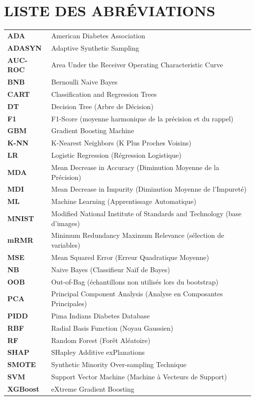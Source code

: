 \chapter*{LISTE DES ABRÉVIATIONS}

\begin{tabular}{p{3.5cm} p{10.5cm}}

\textbf{ADA}      & American Diabetes Association \\[4pt]
\textbf{ADASYN}   & Adaptive Synthetic Sampling \\[4pt]
\textbf{AUC-ROC}  & Area Under the Receiver Operating Characteristic Curve \\[4pt]
\textbf{BNB}      & Bernoulli Naive Bayes \\[4pt]
\textbf{CART}     & Classification and Regression Trees \\[4pt]
\textbf{DT}       & Decision Tree (Arbre de Décision) \\[4pt]
\textbf{F1}       & F1-Score (moyenne harmonique de la précision et du rappel) \\[4pt]
\textbf{GBM}      & Gradient Boosting Machine \\[4pt]
\textbf{K-NN}     & K-Nearest Neighbors (K Plus Proches Voisins) \\[4pt]
\textbf{LR}       & Logistic Regression (Régression Logistique) \\[4pt]
\textbf{MDA}      & Mean Decrease in Accuracy (Diminution Moyenne de la Précision) \\[4pt]
\textbf{MDI}      & Mean Decrease in Impurity (Diminution Moyenne de l'Impureté) \\[4pt]
\textbf{ML}       & Machine Learning (Apprentissage Automatique) \\[4pt]
\textbf{MNIST}    & Modified National Institute of Standards and Technology (base d'images) \\[4pt]
\textbf{mRMR}     & Minimum Redundancy Maximum Relevance (sélection de variables) \\[4pt]
\textbf{MSE}      & Mean Squared Error (Erreur Quadratique Moyenne) \\[4pt]
\textbf{NB}       & Naive Bayes (Classifieur Naïf de Bayes) \\[4pt]
\textbf{OOB}      & Out-of-Bag (échantillons non utilisés lors du bootstrap) \\[4pt]
\textbf{PCA}      & Principal Component Analysis (Analyse en Composantes Principales) \\[4pt]
\textbf{PIDD}     & Pima Indians Diabetes Database \\[4pt]
\textbf{RBF}      & Radial Basis Function (Noyau Gaussien) \\[4pt]
\textbf{RF}       & Random Forest (Forêt Aléatoire) \\[4pt]
\textbf{SHAP}     & SHapley Additive exPlanations \\[4pt]
\textbf{SMOTE}    & Synthetic Minority Over-sampling Technique \\[4pt]
\textbf{SVM}      & Support Vector Machine (Machine à Vecteurs de Support) \\[4pt]
\textbf{XGBoost}  & eXtreme Gradient Boosting \\[4pt]

\end{tabular}